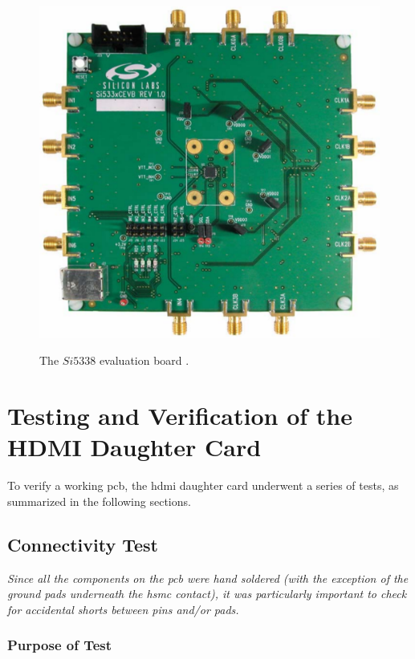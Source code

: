 \documentclass[main.tex]{subfiles}
\begin{document}
\begin{figure} %
\begin{center}
\includegraphics[scale=0.3]{../img/si5338}  \\[0.1 cm]
\caption{The $Si5338$ evaluation board \cite{si16}.}
\label{fig:si5338}
\end{center}
\end{figure} 

\section{Testing and Verification of the HDMI Daughter Card}
To verify a working \gls{pcb}, the \gls{hdmi} daughter card underwent a series of tests, as summarized in the following sections. 

\subsection{Connectivity Test}

\textit{Since all the components on the \gls{pcb} were hand soldered (with the exception of the ground pads underneath the \gls{hsmc} contact), it was particularly important to check for accidental shorts between pins and/or pads.}

\subsubsection{Purpose of Test}
\end{document}
